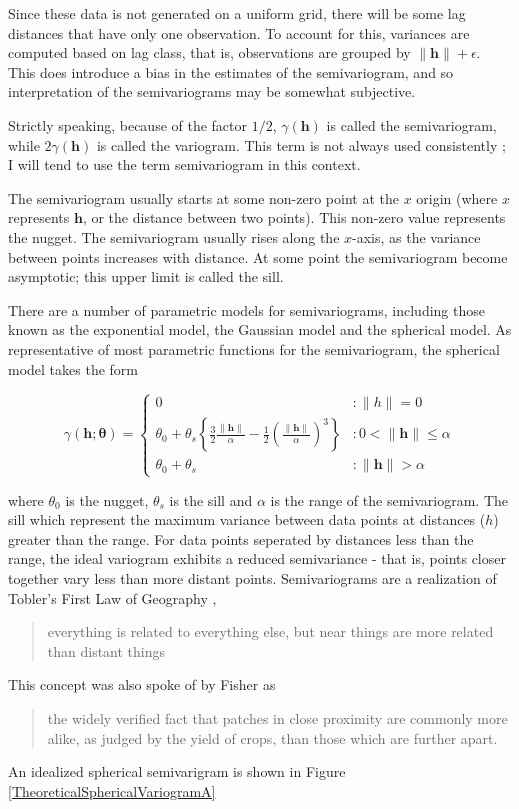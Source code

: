 \documentclass[phdcss]{SDSUThesis}
\begin{document}
Since these data is not generated on a uniform grid, there will be some lag distances that have only one observation. To account for this, variances are computed based on lag class, that is, observations are grouped by $\lVert \mathbf{h} \rVert + \epsilon$. This does introduce a bias in the estimates of the semivariogram, and so interpretation of the semivariograms may be somewhat subjective.

Strictly speaking, because of the factor $1/2$, $\gamma(\mathbf{h})$ is called the semivariogram, while $2 \gamma(\mathbf{h})$ is called the variogram. This term is not always used consistently \cite{bachmaier-02-2008}; I will tend to use the term semivariogram in this context.

The semivariogram usually starts at some non-zero point at the $x$ origin (where $x$ represents $\mathbf{h}$, or the distance between two points). This non-zero value represents the nugget. The semivariogram usually rises along the $x$-axis, as the variance between points increases with distance. At some point the semivariogram become asymptotic; this upper limit is called the sill. 

There are a number of parametric models for semivariograms, including those known as the exponential model, the Gaussian model and the spherical model. As representative of most parametric functions for the semivariogram, the spherical model takes the form

\begin{equation}
   \gamma(\mathbf{h};\mathbf{\theta})=
   \begin{cases} 
       0 &: \lVert h \rVert =0 \\
       \theta_0 + \theta_s \left\{  \frac{3}{2} \frac{\lVert \mathbf{h} \rVert}{\alpha} - \frac{1}{2} \left( \frac{\lVert \mathbf{h} \rVert}{\alpha}\right)^3 \right\} &: 0 < \lVert \mathbf{h} \rVert \le \alpha \\
       \theta_0 + \theta_s &: \lVert \mathbf{h} \rVert > \alpha
    \end{cases}
\end{equation}

where $\theta_0$ is the nugget, $\theta_s$ is the sill and $\alpha$ is the range of the semivariogram. The sill which represent the maximum variance between data points at distances ($h$) greater than the range. For data points seperated by distances less than the range, the ideal variogram exhibits a reduced semivariance - that is, points closer together vary less than more distant points. Semivariograms are a realization of Tobler's First Law of Geography \cite{tobler-06-1970}, 
\begin{quote}
   everything is related to everything else, but near things are more related than distant things
\end{quote}
This concept was also spoke of by Fisher \cite{fisher-1960} as 
\begin{quote}
   the widely verified fact that patches in close proximity are commonly more alike, as judged by the yield of crops, than those which are further apart.
\end{quote}
An idealized spherical semivarigram is shown in Figure \ref{TheoreticalSphericalVariogramA}
\end{document}
